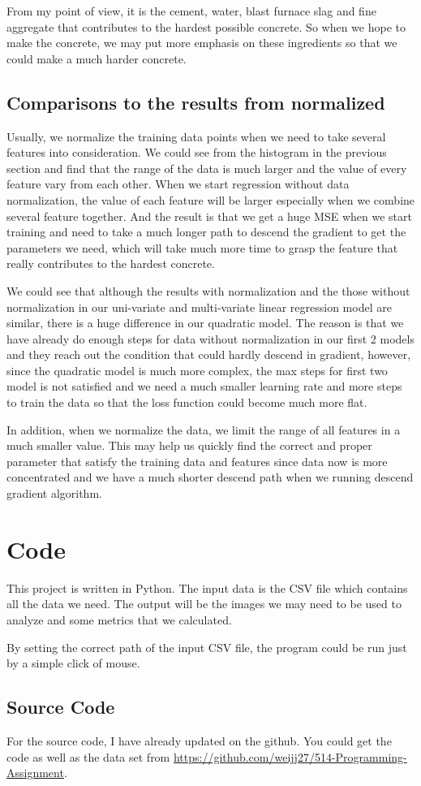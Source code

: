 \documentclass{article}
\begin{document}
From my point of view, it is the cement, water, blast furnace slag and fine aggregate that contributes to the hardest possible concrete. So when we hope to make the concrete, we may put more emphasis on these ingredients so that we could make a much harder concrete.


\subsection{Comparisons to the results from normalized}
Usually, we normalize the training data points when we need to take several features into consideration. We could see from the histogram in the previous section and find that the range of the data is much larger and the value of every feature vary from each other. When we start regression without data normalization, the value of each feature will be larger especially when we combine several feature together. And the result is that we get a huge MSE when we start training and need to take a much longer path to descend the gradient to get the parameters we need, which will take much more time to grasp the feature that really contributes to the hardest concrete.

We could see that although the results with normalization and the those without normalization in our uni-variate and multi-variate linear regression model are similar, there is a huge difference in our quadratic model. The reason is that we have already do enough steps for data without normalization in our first 2 models and they reach out the condition that could hardly descend in gradient, however, since the quadratic model is much more complex, the max steps for first two model is not satisfied and we need a much smaller learning rate and more steps to train the data so that the loss function could become much more flat.

In addition, when we normalize the data, we limit the range of all features in a much smaller value. This may help us quickly find the correct and proper parameter that satisfy the training data and features since data now is more concentrated and we have a much shorter descend path when we running descend gradient algorithm.


\section{Code}
This project is written in Python. The input data is the CSV file which contains all the data we need. The output will be the images we may need to be used to analyze and some metrics that we calculated.

By setting the correct path of the input CSV file, the program could be run just by a simple click of mouse.

\subsection{Source Code}
For the source code, I have already updated on the github. You could get the code as well as the data set from \url{https://github.com/weijj27/514-Programming-Assignment}.

%
%
\end{document}
